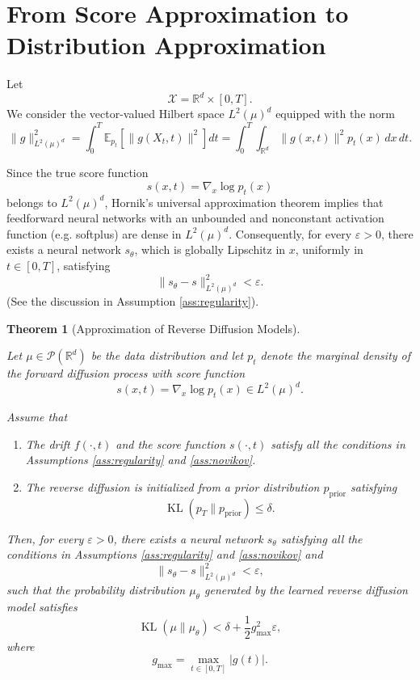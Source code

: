 \documentclass[11pt]{article}
\newtheorem{theorem}{Theorem}
\DeclareMathOperator{\KL}{KL}
\begin{document}
\section{From Score Approximation to Distribution Approximation}

Let
\[
\mathcal{X}=\mathbb{R}^d\times[0,T].
\]
We consider the vector-valued Hilbert space $L^2(\mu)^d$ equipped with the norm
\[
\|g\|_{L^2(\mu)^d}^2
=
\int_0^T
\mathbb{E}_{p_t}
\!\left[
\|g(X_t,t)\|^2
\right]
dt
=
\int_0^T
\int_{\mathbb{R}^d}
\|g(x,t)\|^2
p_t(x)
\,dx\,dt.
\]

Since the true score function
\[
s(x,t)=\nabla_x\log p_t(x)
\]
belongs to $L^2(\mu)^d$, Hornik's universal approximation theorem \cite[Theorem 1]{Hornik1991} implies that feedforward neural networks with an
unbounded and nonconstant  activation function (e.g. softplus) are dense in $L^2(\mu)^d$.
Consequently, for every $\varepsilon>0$, there exists a neural network
$s_\theta$, which is globally Lipschitz in $x$,
uniformly in $t\in[0,T]$, satisfying
\begin{equation}
\label{eq:L2-approx}
\|s_\theta-s\|_{L^2(\mu)^d}^2
<
\varepsilon.
\end{equation}
(See the discussion in Assumption \ref{ass:regularity}). 


\begin{theorem}[Approximation of Reverse Diffusion Models]
\label{thm:main}

Let $\mu\in\mathcal P(\mathbb R^d)$ be the data distribution and let
$p_t$ denote the marginal density of the forward diffusion process with
score function
\[
s(x,t)=\nabla_x\log p_t(x)\in L^2(\mu)^d.
\]

Assume that

\begin{enumerate}
\item
The drift $f(\cdot,t)$ and the score function $s(\cdot,t)$ satisfy all the conditions in Assumptions \ref{ass:regularity} and \ref{ass:novikov}. 
\item
The reverse diffusion is initialized from a prior distribution
$p_{\mathrm{prior}}$ satisfying
\[
\KL(p_T\|p_{\mathrm{prior}})
\le
\delta.
\]
\end{enumerate}

Then, for every $\varepsilon>0$, there exists a neural network
$s_\theta$ satisfying all the conditions in Assumptions \ref{ass:regularity} and \ref{ass:novikov} and
\[
\|s_\theta-s\|_{L^2(\mu)^d}^2
<
\varepsilon,
\]
such that the probability distribution $\mu_\theta$
generated by the learned reverse diffusion model satisfies
\[
\boxed{
\KL(\mu\|\mu_\theta)
<
\delta
+
\frac12
g_{\max}^2
\varepsilon,
}
\]
where
\[
g_{\max}
=
\max_{t\in[0,T]}
|g(t)|.
\]

\end{theorem}
\end{document}
